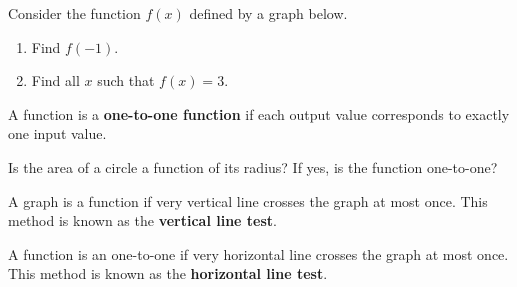 \begin{example}
  Consider the function $f(x)$ defined by a graph below.

  \begin{multicols}{2}
    \begin{enumerate}
      \item Find $f(-1)$. 
      \item Find all $x$ such that $f(x)=3$.
    \end{enumerate}
    \vfill

    \columnbreak
    

  \end{multicols}
\end{example}
\vspace*{-12\baselineskip}

\newpage

\begin{definition}
  A function is a \textbf{one-to-one function} if each output value corresponds to exactly one input value.
\end{definition}

\begin{example}
  Is the area of a circle a function of its radius? If yes, is the function one-to-one?
\end{example}

\begin{howto}
  A graph is a function if very vertical line crosses the graph at most once. This method is known as the \textbf{vertical line test}.

A function is an one-to-one if very horizontal line crosses the graph at most once. This method is known as the \textbf{horizontal line test}.
\end{howto}

